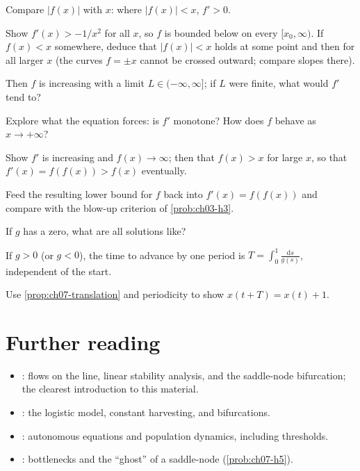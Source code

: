 \begin{hintlevels}
  \item Compare $|f(x)|$ with $x$: where $|f(x)|<x$, $f'>0$.
  \item Show $f'(x)>-1/x^2$ for all $x$, so $f$ is bounded below on every
        $[x_0,\infty)$. If $f(x)<x$ somewhere, deduce that $|f(x)|<x$ holds at
        some point and then for all larger $x$ (the curves $f = \pm x$ cannot be
        crossed outward; compare slopes there).
  \item Then $f$ is increasing with a limit $L\in(-\infty,\infty]$; if $L$ were
        finite, what would $f'$ tend to?
\end{hintlevels}

\begin{hintlevels}
  \item Explore what the equation forces: is $f'$ monotone? How does $f$
        behave as $x\to+\infty$?
  \item Show $f'$ is increasing and $f(x)\to\infty$; then that $f(x)>x$ for
        large $x$, so that $f'(x) = f(f(x))>f(x)$ eventually.
  \item Feed the resulting lower bound for $f$ back into $f'(x) = f(f(x))$ and
        compare with the blow-up criterion of \cref{prob:ch03-h3}.
\end{hintlevels}

\begin{hintlevels}
  \item If $g$ has a zero, what are all solutions like?
  \item If $g>0$ (or $g<0$), the time to advance by one period is
        $T = \int_0^1\frac{\mathrm{d}s}{g(s)}$, independent of the start.
  \item Use \cref{prop:ch07-translation} and periodicity to show
        $x(t + T) = x(t) + 1$.
\end{hintlevels}

\section{Further reading}\label{sec:ch07-reading}

\begin{itemize}
  \item \textcite[Ch.~2 and \S3.1]{Strogatz}: flows on the line, linear
        stability analysis, and the saddle-node bifurcation; the clearest
        introduction to this material.
  \item \textcite[\S\S1.2--1.3]{HSD}: the logistic model, constant harvesting,
        and bifurcations.
  \item \textcite[\S2.5]{BoyceDiPrima}: autonomous equations and population
        dynamics, including thresholds.
  \item \textcite[\S4.3]{Strogatz}: bottlenecks and the ``ghost'' of a
        saddle-node (\cref{prob:ch07-h5}).
\end{itemize}
